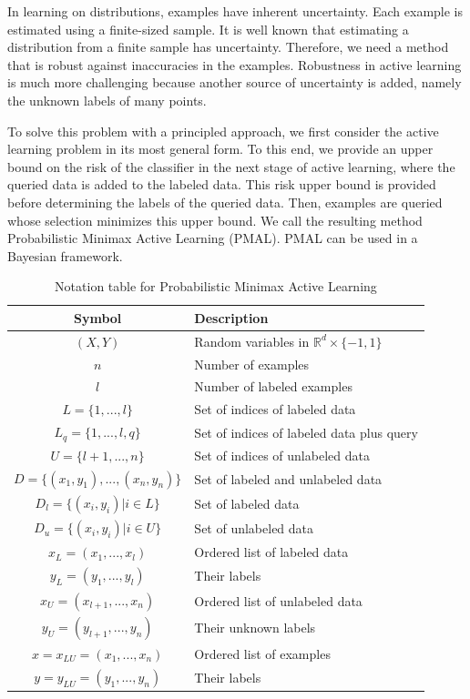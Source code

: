 \documentclass[12pt]{article}
\begin{document}
	In learning on distributions, examples have inherent uncertainty. Each example is estimated using a finite-sized sample. It is well known that estimating a distribution from a finite sample has uncertainty. Therefore, we need a method that is robust against inaccuracies in the examples. Robustness in active learning is much more challenging because another source of uncertainty is added, namely the unknown labels of many points.
	
	To solve this problem with a principled approach, we first consider the active learning problem in its most general form. To this end, we provide an upper bound on the risk of the classifier in the next stage of active learning, where the queried data is added to the labeled data. This risk upper bound is provided before determining the labels of the queried data. Then, examples are queried whose selection minimizes this upper bound. We call the resulting method Probabilistic Minimax Active Learning (PMAL). PMAL can be used in a Bayesian framework.
	
	\begin{table}[h!]
		\centering
		\caption{Notation table for Probabilistic Minimax Active Learning}
		\label{tab:pmal-notation}
		\begin{tabular}{c|l}
			\hline
			Symbol & Description \\
			\hline
			$(X, Y)$ & Random variables in $\mathbb{R}^d \times \{-1, 1\}$ \\
			$n$ & Number of examples \\
			$l$ & Number of labeled examples \\
			$L = \{1, ..., l\}$ & Set of indices of labeled data \\
			$L_q = \{1, ..., l, q\}$ & Set of indices of labeled data plus query \\
			$U = \{l+1, ..., n\}$ & Set of indices of unlabeled data \\
			$D = \{(x_1, y_1), ..., (x_n, y_n)\}$ & Set of labeled and unlabeled data \\
			$D_l = \{(x_i, y_i) | i \in L\}$ & Set of labeled data \\
			$D_u = \{(x_i, y_i) | i \in U\}$ & Set of unlabeled data \\
			$x_L = (x_1, ..., x_l)$ & Ordered list of labeled data \\
			$y_L = (y_1, ..., y_l)$ & Their labels \\
			$x_U = (x_{l+1}, ..., x_n)$ & Ordered list of unlabeled data \\
			$y_U = (y_{l+1}, ..., y_n)$ & Their unknown labels \\
			$x = x_{LU} = (x_1, ..., x_n)$ & Ordered list of examples \\
			$y = y_{LU} = (y_1, ..., y_n)$ & Their labels \\
			\hline
		\end{tabular}
	\end{table}
	
\end{document}
